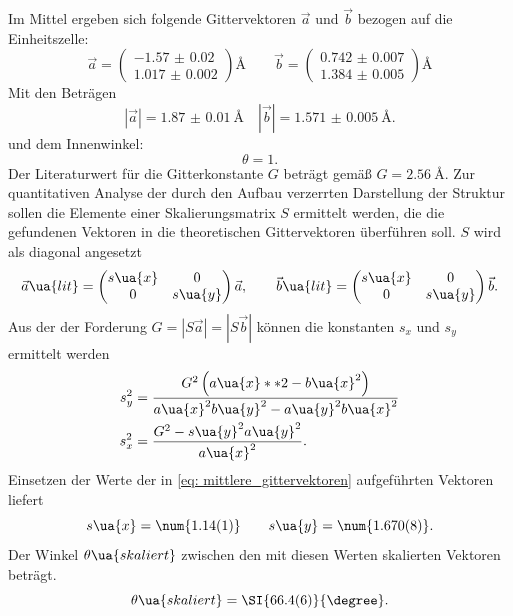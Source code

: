 Im Mittel ergeben sich folgende Gittervektoren $\vec{a}$ und $\vec{b}$ bezogen auf die Einheitszelle:
\begin{equation}
  \vec{a} = \begin{pmatrix} \num{-1.57(2)} \\  \num{1.017(2)} \end{pmatrix}\si{\angstrom} \qquad
  \vec{b} = \begin{pmatrix} \num{0.742(7)} \\  \num{1.384(5)} \end{pmatrix}\si{\angstrom}
\end{equation}
Mit den Beträgen
\begin{equation}
  \left|\vec{a}\right| = \SI{1.87(1)}{\angstrom} \quad \left|\vec{b}\right| = \SI{1.571(5)}{\angstrom}.
  \label{eq: mittlere_gittervektoren}
\end{equation}
und dem Innenwinkel:
\begin{equation}
  \theta = 1.
\end{equation}
Der Literaturwert für die Gitterkonstante $G$ beträgt gemäß \cite{} $G = \SI{2.56}{\angstrom}$. Zur quantitativen Analyse
der durch den Aufbau verzerrten Darstellung der Struktur sollen die Elemente einer Skalierungsmatrix $S$ ermittelt werden, die
die gefundenen Vektoren in die theoretischen Gittervektoren überführen soll. $S$ wird als diagonal angesetzt
\begin{equation}
  \vec{a}\ua{lit} = \begin{pmatrix} s\ua{x} & 0 \\  0  &   s\ua{y} \end{pmatrix} \vec{a},
  \qquad \vec{b}\ua{lit} = \begin{pmatrix} s\ua{x} & 0 \\  0  &   s\ua{y} \end{pmatrix} \vec{b}.
\end{equation}
Aus der der Forderung $G = \left|S \vec{a}\right| = \left|S \vec{b}\right|$ können die konstanten $s_x$ und $s_y$ ermittelt werden
\begin{align}
  s_y^2 &= \frac{G^2\left( a\ua{x}**2 - b\ua{x}^2\right)}{a\ua{x}^2 b\ua{y}^2 - a\ua{y}^2 b\ua{x}^2} \\
  s_x^2 &= \frac{G^2 - s\ua{y}^2 a\ua{y}^2}{a\ua{x}^2}.
\end{align}
Einsetzen der Werte der in \eqref{eq: mittlere_gittervektoren} aufgeführten Vektoren liefert
\begin{equation}
  s\ua{x} = \num{1.14(1)}  \qquad s\ua{y} = \num{1.670(8)}.
\end{equation}
Der Winkel $\theta\ua{skaliert}$ zwischen den mit diesen Werten skalierten Vektoren beträgt.
\begin{equation}
  \theta\ua{skaliert} = \SI{66.4(6)}{\degree}.
\end{equation}


